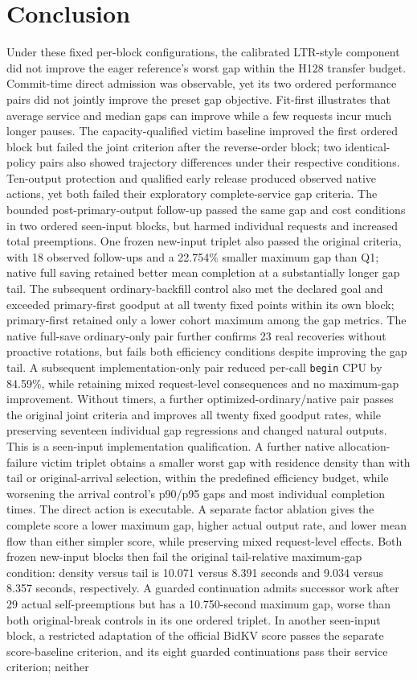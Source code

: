 \documentclass[10pt]{article}
\begin{document}
\section{Conclusion}
Under these fixed per-block configurations, the calibrated LTR-style component did not improve the eager reference's worst gap within the H128 transfer budget. Commit-time direct admission was observable, yet its two ordered performance pairs did not jointly improve the preset gap objective. Fit-first illustrates that average service and median gaps can improve while a few requests incur much longer pauses. The capacity-qualified victim baseline improved the first ordered block but failed the joint criterion after the reverse-order block; two identical-policy pairs also showed trajectory differences under their respective conditions. Ten-output protection and qualified early release produced observed native actions, yet both failed their exploratory complete-service gap criteria. The bounded post-primary-output follow-up passed the same gap and cost conditions in two ordered seen-input blocks, but harmed individual requests and increased total preemptions. One frozen new-input triplet also passed the original criteria, with 18 observed follow-ups and a 22.754\% smaller maximum gap than Q1; native full saving retained better mean completion at a substantially longer gap tail. The subsequent ordinary-backfill control also met the declared goal and exceeded primary-first goodput at all twenty fixed points within its own block; primary-first retained only a lower cohort maximum among the gap metrics. The native full-save ordinary-only pair further confirms 23 real recoveries without proactive rotations, but fails both efficiency conditions despite improving the gap tail. A subsequent implementation-only pair reduced per-call \texttt{begin} CPU by 84.59\%, while retaining mixed request-level consequences and no maximum-gap improvement. Without timers, a further optimized-ordinary/native pair passes the original joint criteria and improves all twenty fixed goodput rates, while preserving seventeen individual gap regressions and changed natural outputs. This is a seen-input implementation qualification. A further native allocation-failure victim triplet obtains a smaller worst gap with residence density than with tail or original-arrival selection, within the predefined efficiency budget, while worsening the arrival control's p90/p95 gaps and most individual completion times. The direct action is executable. A separate factor ablation gives the complete score a lower maximum gap, higher actual output rate, and lower mean flow than either simpler score, while preserving mixed request-level effects. Both frozen new-input blocks then fail the original tail-relative maximum-gap condition: density versus tail is 10.071 versus 8.391 seconds and 9.034 versus 8.357 seconds, respectively. A guarded continuation admits successor work after 29 actual self-preemptions but has a 10.750-second maximum gap, worse than both original-break controls in its one ordered triplet. In another seen-input block, a restricted adaptation of the official BidKV score passes the separate score-baseline criterion, and its eight guarded continuations pass their service criterion; neither 
\end{document}
